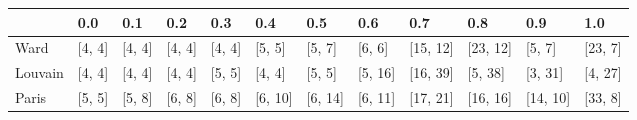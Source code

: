 \begin{tabular}{llllllllllll}
\toprule
{} &     0.0 &     0.1 &     0.2 &     0.3 &      0.4 &      0.5 &      0.6 &       0.7 &       0.8 &       0.9 &      1.0 \\
\midrule
Ward    &  [4, 4] &  [4, 4] &  [4, 4] &  [4, 4] &   [5, 5] &   [5, 7] &   [6, 6] &  [15, 12] &  [23, 12] &    [5, 7] &  [23, 7] \\
Louvain &  [4, 4] &  [4, 4] &  [4, 4] &  [5, 5] &   [4, 4] &   [5, 5] &  [5, 16] &  [16, 39] &   [5, 38] &   [3, 31] &  [4, 27] \\
Paris   &  [5, 5] &  [5, 8] &  [6, 8] &  [6, 8] &  [6, 10] &  [6, 14] &  [6, 11] &  [17, 21] &  [16, 16] &  [14, 10] &  [33, 8] \\
\bottomrule
\end{tabular}
